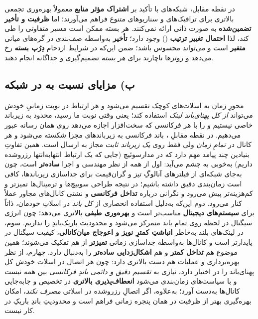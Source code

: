 در نقطه مقابل، شبکه‌های  با تأکید بر \textbf{اشتراک مؤثر منابع} معمولاً بهره‌وری تجمعی بالاتری برای ترافیک‌های  و سناریوهای متنوع فراهم می‌آورند؛ اما \textbf{ظرفیت و تأخیر تضمین‌شده} به صورت ذاتی ارائه نمی‌کنند. هر بسته ممکن است مسیر متفاوتی را طی کند، لذا \textbf{احتمال تغییر ترتیب} () وجود دارد؛ \textbf{تأخیر} به‌واسطه صف‌بندی در گره‌های میانی \textbf{متغیر} است و  می‌تواند محسوس باشد؛ ضمن این‌که در شرایط ازدحام \textbf{دِرُپ بسته} رخ می‌دهد و روترها ناچارند برای \emph{هر بسته} تصمیم‌گیری و  جداگانه انجام دهند.


\subsection{ب) مزایای  نسبت به  در شبکه }  محورِ زمان به اسلات‌های کوچک تقسیم می‌شود و هر ارتباط در نوبت زمانیِ خودش می‌تواند \emph{از کل پهنای‌باند لینک} استفاده کند؛ یعنی وقتی نوبت ما رسید، محدود به زیر‌باند خاصی نیستیم و  را با هر فرکانسی که سخت‌افزار اجازه می‌دهد روی همان رسانه عبور می‌دهیم. در نقطه مقابلِ ، باند فرکانسی به زیر‌باندهای مجزا شکسته می‌شود و هر کانال در \emph{تمامِ زمان} ولی فقط روی \emph{یک زیر‌باند ثابت} مجاز به ارسال است. همین تفاوتِ بنیادین چند پیامد مهم دارد که در مدارسوئیچ (جایی که یک ارتباط انتها‌به‌انتها رزروشده داریم) به‌خوبی به چشم می‌آید: اول از همه  از نظر مهندسی و اجرا \textbf{ساده‌تر} است، چون به‌جای شبکه‌ای از فیلترهای آنالوگِ تیز و گران‌قیمت برای جداسازی زیر‌باندها، کافی است زمان‌بندی دقیق داشته باشیم؛ در نتیجه طراحی سوییچ‌ها و ترمینال‌ها تمیزتر و کم‌هزینه‌تر پیش می‌رود و نگرانی درباره \textbf{تداخل فرکانسی} و نشتی کانال‌های مجاور عملاً کنار می‌رود. دوم این‌که به‌دلیل استفاده انحصاری از \emph{کل باند} در اسلاتِ خودمان،  ذاتاً برای \textbf{سیستم‌های دیجیتال} مناسب‌تر است و \textbf{بهره‌وری طیفی} بالاتری می‌دهد؛ چون انرژی سیگنال در لحظه روی تمام باند متمرکز می‌شود و محدودیت باریک‌باندِ  را نداریم. سوم، در لینک‌های بلند به‌خاطر \textbf{انباشتِ کمترِ نویز و اعوجاج میان‌کانالی}، کیفیت سیگنال در  پایدارتر است و کانال‌ها به‌واسطه جداسازی زمانی \textbf{تمیزتر} از هم تفکیک می‌شوند؛ همین موضوع هم \textbf{تداخل کمتر} و هم \textbf{اشکال‌زدایی ساده‌تر} را به‌دنبال دارد. چهارم،  از نظر بهره‌برداری و عملیات هم دست بالاتری دارد: چون هر اتصال در اسلات خودش کل پهنای‌باند را در اختیار دارد، نیازی به \emph{تقسیم دقیق و دائمی باندِ فرکانسی} بین همه نیست و با سیاست‌های زمان‌بندی می‌شود \textbf{انعطاف‌پذیری بالاتری} در تخصیص و جابه‌جایی کانال‌ها به‌دست آورد؛ به‌علاوه، اگر اتصالِ رزروشده در اسلاتی \emph{مصرف نکند}، امکان بهره‌گیری بهتر از ظرفیت در همان پنجره زمانی فراهم است و محدودیتِ باندِ باریکِ  در کار نیست.


